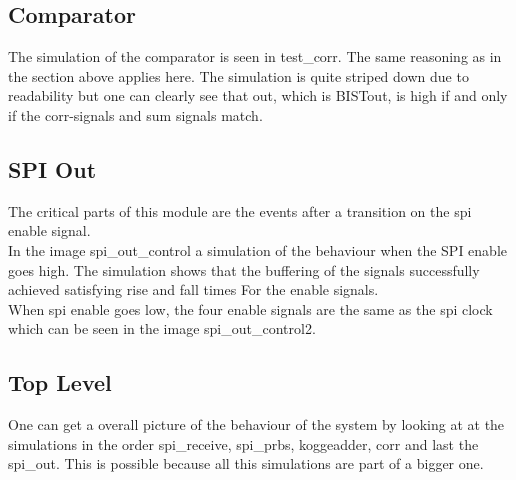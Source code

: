 \subsection{Comparator}
The simulation of the comparator is seen in test\_corr. The same reasoning as in the section above applies here. The simulation is quite striped down due to readability but one can clearly see that out, which is BISTout, is high if and only if the corr-signals and sum signals match.

\subsection{SPI Out}
The critical parts of this module are the events after a transition on the spi enable signal.\\




In the image spi\_out\_control a simulation of the behaviour when the SPI enable goes high. The simulation shows that the buffering of the signals successfully achieved satisfying rise and fall times For the enable signals.\\


When spi enable goes low, the four enable signals are the same as the spi clock which can be seen in the image spi\_out\_control2. \\


\subsection{Top Level}
One can get a overall picture of the behaviour of the system by looking at at the simulations in the order spi\_receive, spi\_prbs, koggeadder, corr and last the spi\_out. This is possible because all this simulations are part of a bigger one.

